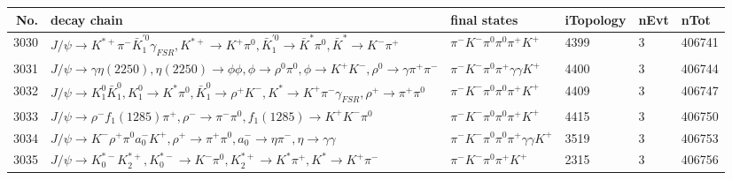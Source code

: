 \begin{table}[htbp] 
\begin{center}
\begin{small}
\begin{tabular}{rlllll}\hline\hline
 No. & decay chain & final states &  iTopology & nEvt & nTot \\\hline
3030&$J/\psi       \rightarrow K^{*+}         \pi^{-}        \bar{K}_1^{'0}\gamma_{FSR} , K^{*+}          \rightarrow K^{+}          \pi^{0}        , \bar{K}_1^{'0} \rightarrow \bar{K}^{*}   \pi^{0}        , \bar{K}^{*}    \rightarrow K^{-}          \pi^{+}        $&$\pi^{-}        K^{-}          \pi^{0}        \pi^{0}        \pi^{+}        K^{+}          $& 4399&    3&406741\\
3031&$J/\psi       \rightarrow \gamma       \eta(2250)    , \eta(2250)     \rightarrow \phi           \phi           , \phi            \rightarrow \rho^{0}      \pi^{0}        , \phi            \rightarrow K^{+}          K^{-}          , \rho^{0}       \rightarrow \gamma       \pi^{+}        \pi^{-}        $&$\pi^{-}        K^{-}          \pi^{0}        \pi^{+}        \gamma       \gamma       K^{+}          $& 4400&    3&406744\\
3032&$J/\psi       \rightarrow K_1^{0}        \bar{K}_1^{0} , K_1^{0}         \rightarrow K^{*}          \pi^{0}        , \bar{K}_1^{0}  \rightarrow \rho^{+}      K^{-}          , K^{*}           \rightarrow K^{+}          \pi^{-}        \gamma_{FSR} , \rho^{+}       \rightarrow \pi^{+}        \pi^{0}        $&$\pi^{-}        K^{-}          \pi^{0}        \pi^{0}        \pi^{+}        K^{+}          $& 4409&    3&406747\\
3033&$J/\psi       \rightarrow \rho^{-}      f_{1}(1285)    \pi^{+}        , \rho^{-}       \rightarrow \pi^{-}        \pi^{0}        , f_{1}(1285)     \rightarrow K^{+}          K^{-}          \pi^{0}        $&$\pi^{-}        K^{-}          \pi^{0}        \pi^{0}        \pi^{+}        K^{+}          $& 4415&    3&406750\\
3034&$J/\psi       \rightarrow K^{-}          \rho^{+}      \pi^{0}        a_{0}^{-}      K^{+}          , \rho^{+}       \rightarrow \pi^{+}        \pi^{0}        , a_{0}^{-}       \rightarrow \eta          \pi^{-}        , \eta           \rightarrow \gamma       \gamma       $&$\pi^{-}        K^{-}          \pi^{0}        \pi^{0}        \pi^{+}        \gamma       \gamma       K^{+}          $& 3519&    3&406753\\
3035&$J/\psi       \rightarrow K_{0}^{*-}     K_2^{*+}       , K_{0}^{*-}      \rightarrow K^{-}          \pi^{0}        , K_2^{*+}        \rightarrow K^{*}          \pi^{+}        , K^{*}           \rightarrow K^{+}          \pi^{-}        $&$\pi^{-}        K^{-}          \pi^{0}        \pi^{+}        K^{+}          $& 2315&    3&406756\\

\end{tabular}
\end{small}
\end{center}
\end{table}
